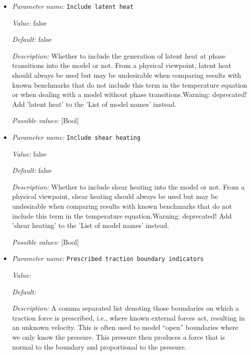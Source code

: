 \begin{itemize}
{\it Possible values:} [Bool]
\item {\it Parameter name:} {\tt Include latent heat}
\label{parameters:Model settings/Include latent heat}


{\it Value:} false


{\it Default:} false


{\it Description:} Whether to include the generation of latent heat at phase transitions into the model or not. From a physical viewpoint, latent heat should always be used but may be undesirable when comparing results with known benchmarks that do not include this term in the temperature equation or when dealing with a model without phase transitions.Warning: deprecated! Add 'latent heat' to the 'List of model names' instead.


{\it Possible values:} [Bool]
\item {\it Parameter name:} {\tt Include shear heating}
\label{parameters:Model settings/Include shear heating}


{\it Value:} false


{\it Default:} false


{\it Description:} Whether to include shear heating into the model or not. From a physical viewpoint, shear heating should always be used but may be undesirable when comparing results with known benchmarks that do not include this term in the temperature equation.Warning: deprecated! Add 'shear heating' to the 'List of model names' instead.


{\it Possible values:} [Bool]
\item {\it Parameter name:} {\tt Prescribed traction boundary indicators}
\label{parameters:Model settings/Prescribed traction boundary indicators}


{\it Value:} 


{\it Default:} 


{\it Description:} A comma separated list denoting those boundaries on which a traction force is prescribed, i.e., where known external forces act, resulting in an unknown velocity. This is often used to model ``open'' boundaries where we only know the pressure. This pressure then produces a force that is normal to the boundary and proportional to the pressure.


\end{itemize}
